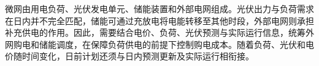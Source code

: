 微网由用电负荷、光伏发电单元、储能装置和外部电网组成。光伏出力与负荷需求在日内并不完全匹配，储能可通过充放电将电能转移至其他时段，外部电网则承担补充供电的作用。因此，需要结合电价、负荷、光伏预测与实际运行信息，统筹外网购电和储能调度，在保障负荷供电的前提下控制购电成本。随着负荷、光伏和电价随时间变化，日前计划还须与日内预测更新及实际运行相衔接。
